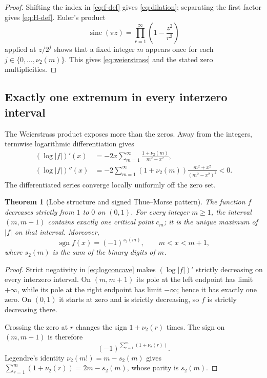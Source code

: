 \documentclass[11pt,oneside]{article}
\newtheorem{theorem}{Theorem}[section]
\theoremstyle{definition}
\theoremstyle{remark}
\newcommand{\sinc}{\operatorname{sinc}}
\newcommand{\vtwo}{\nu_2}
\newcommand{\wt}{s_2}
\begin{document}
\begin{proof}
Shifting the index in \eqref{eq:f-def} gives \eqref{eq:dilation}; separating
the first factor gives \eqref{eq:H-def}.  Euler's product
\[
 \sinc(\pi z)=\prod_{r=1}^{\infty}\left(1-\frac{z^2}{r^2}\right)
\]
applied at $z/2^j$ shows that a fixed integer $m$ appears once for each
$j\in\{0,\ldots,\vtwo(m)\}$.  This gives \eqref{eq:weierstrass} and the stated
zero multiplicities.
\end{proof}

\subsection{Exactly one extremum in every interzero interval}

The Weierstrass product exposes more than the zeros.  Away from the integers,
termwise logarithmic differentiation gives
\begin{align}
 (\log|f|)'(x)
 &=-2x\sum_{m=1}^{\infty}
   \frac{1+\vtwo(m)}{m^2-x^2},
 \label{eq:logder}\\
 (\log|f|)''(x)
 &=-2\sum_{m=1}^{\infty}(1+\vtwo(m))
   \frac{m^2+x^2}{(m^2-x^2)^2}<0.
 \label{eq:logconcave}
\end{align}
The differentiated series converge locally uniformly off the zero set.

\begin{theorem}[Lobe structure and signed Thue--Morse pattern]
\label{thm:lobes}
The function $f$ decreases strictly from $1$ to $0$ on $(0,1)$.  For every
integer $m\ge1$, the interval $(m,m+1)$ contains exactly one critical point
$c_m$; it is the unique maximum of $|f|$ on that interval.  Moreover,
\begin{equation}
 \operatorname{sgn}f(x)=(-1)^{\wt(m)},
 \qquad m<x<m+1,
 \label{eq:TM-sign}
\end{equation}
where $\wt(m)$ is the sum of the binary digits of $m$.
\end{theorem}

\begin{proof}
Strict negativity in \eqref{eq:logconcave} makes $(\log|f|)'$ strictly
decreasing on every interzero interval.  On $(m,m+1)$ its pole at the left
endpoint has limit $+\infty$, while its pole at the right endpoint has limit
$-\infty$; hence it has exactly one zero.  On $(0,1)$ it starts at zero and is
strictly decreasing, so $f$ is strictly decreasing there.

Crossing the zero at $r$ changes the sign $1+\vtwo(r)$ times.  The sign on
$(m,m+1)$ is therefore
\[
 (-1)^{\sum_{r=1}^{m}(1+\vtwo(r))}.
\]
Legendre's identity $\vtwo(m!)=m-\wt(m)$ gives
$\sum_{r=1}^{m}(1+\vtwo(r))=2m-\wt(m)$, whose parity is $\wt(m)$.
\end{proof}
\end{document}
